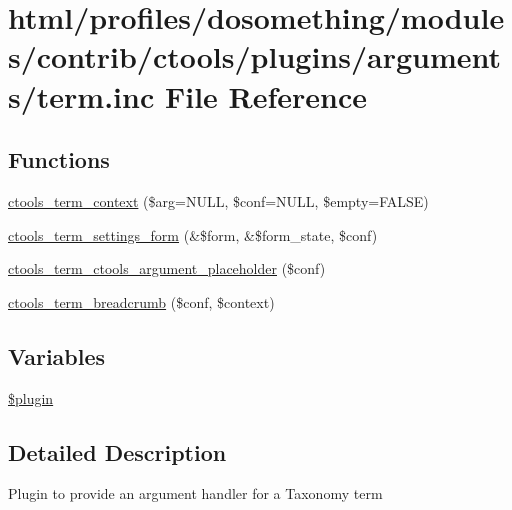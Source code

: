 \hypertarget{arguments_2term_8inc}{
\section{html/profiles/dosomething/modules/contrib/ctools/plugins/arguments/term.inc File Reference}
\label{arguments_2term_8inc}
}
\subsection*{Functions}
\begin{DoxyCompactItemize}
\item 
\hyperlink{arguments_2term_8inc_a75a1887ebce05f09df059f33eb495048}{ctools\_\-term\_\-context} (\$arg=NULL, \$conf=NULL, \$empty=FALSE)
\item 
\hyperlink{arguments_2term_8inc_af4a25873906e508bdf514e26c1d5120d}{ctools\_\-term\_\-settings\_\-form} (\&\$form, \&\$form\_\-state, \$conf)
\item 
\hyperlink{arguments_2term_8inc_a24d6278aff14d86da27c59993507ce52}{ctools\_\-term\_\-ctools\_\-argument\_\-placeholder} (\$conf)
\item 
\hyperlink{arguments_2term_8inc_ac6b9540df9878fcf5fcd2ccca97911a8}{ctools\_\-term\_\-breadcrumb} (\$conf, \$context)
\end{DoxyCompactItemize}
\subsection*{Variables}
\begin{DoxyCompactItemize}
\item 
\hyperlink{arguments_2term_8inc_ada8a7130088351710bb02ed622d6bf65}{\$plugin}
\end{DoxyCompactItemize}


\subsection{Detailed Description}
Plugin to provide an argument handler for a Taxonomy term 

